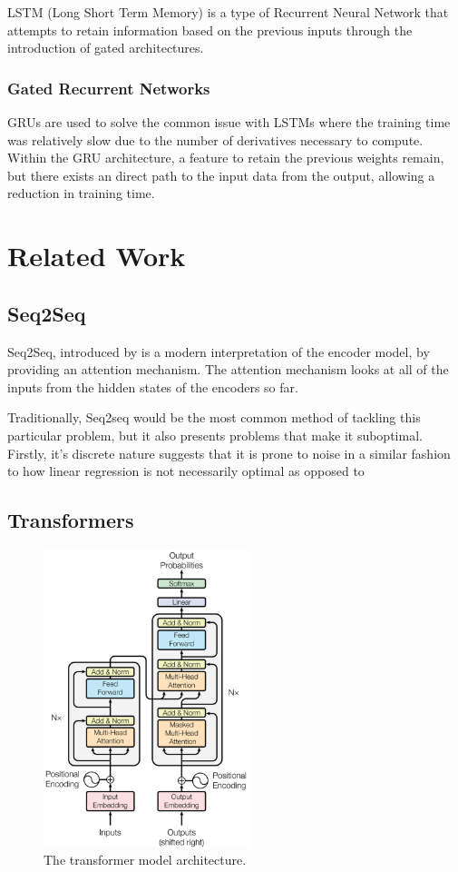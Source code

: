 \documentclass[12pt,twoside]{report}
\begin{document}
LSTM (Long Short Term Memory) is a type of Recurrent Neural Network that attempts to retain information based on the previous inputs through the introduction of gated architectures.

\subsubsection{Gated Recurrent Networks}

GRUs are used to solve the common issue with LSTMs where the training time was relatively slow due to the number of derivatives necessary to compute. Within the GRU architecture, a feature to retain the previous weights remain, but there exists an direct path to the input data from the output, allowing a reduction in training time.

\section{Related Work}

\subsection{Seq2Seq}

Seq2Seq, introduced by \cite{sutskever_sequence_2014} is a modern interpretation of the encoder model, by providing an attention mechanism. The attention mechanism looks at all of the inputs from the hidden states of the encoders so far. 

Traditionally, Seq2seq would be the most common method of tackling this particular problem, but it also presents problems that make it suboptimal. Firstly, it's discrete nature suggests that it is prone to noise in a similar fashion to how linear regression is not necessarily optimal as opposed to 

\subsection{Transformers}

\begin{figure}[!ht]
      
	\centering
	\includegraphics[width=60mm]{diagrams/transformers.png}
	\caption{The transformer model architecture.\cite{vaswani_attention_2017} \label{transformer}}
  \end{figure}
\end{document}
